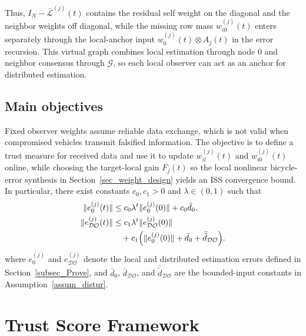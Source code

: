 \documentclass[letterpaper,journal]{IEEEtran}
\def\G{\mathcal{G}} %
\def\L{\mathcal{L}} %
\def\DO{\mathcal{DO}} %
\begin{document}
    Thus, $I_N-\bar{\L}^{(j)}(t)$ contains the residual self weight on the diagonal and the neighbor weights off diagonal, while the missing row mass $w_{i0}^{(j)}(t)$ enters separately through the local-anchor input $w_0^{(j)}(t)\otimes A_j(t)$ in the error recursion. This virtual graph combines local estimation through node $0$ and neighbor consensus through $\G$, so each local observer can act as an anchor for distributed estimation.

\subsection{Main objectives}
Fixed observer weights assume reliable data exchange, which is not valid when compromised vehicles transmit falsified information. The objective is to define a trust measure for received data and use it to update $w_{il}^{(j)}(t)$ and $w_{i0}^{(j)}(t)$ online, while choosing the target-local gain $F_j(t)$ so the local nonlinear bicycle-error synthesis in Section~\ref{sec_weight_design} yields an ISS convergence bound. In particular, there exist constants $c_0, c_1 > 0$ and $\lambda \in (0,1)$ such that
\begin{align}
\|e_0^{(j)}(t)\| &\le c_0\lambda^t \|e_0^{(j)}(0)\| + c_0 \bar{d}_0,\label{eq_iss_e0}\\
\|e_{\DO}^{(j)}(t)\| &\le c_1\lambda^t \|e_{\DO}^{(j)}(0)\| \notag\\
&\quad+ c_1 \Big(\|e_0^{(j)}(0)\| + \bar{d}_0 + \bar{\tilde d}_{\DO}\Big). \label{eq_iss_edo}
\end{align}
where $e_0^{(j)}$ and $e_{\DO}^{(j)}$ denote the local and distributed estimation errors defined in Section~\ref{subsec_Prove}, and $\bar{d}_0$, $\bar{d}_{\DO}$, and $\bar{\tilde{d}}_{\DO}$ are the bounded-input constants in Assumption~\ref{assum_distur}.


\section{Trust Score Framework}\label{sec_trust_score}
\end{document}
